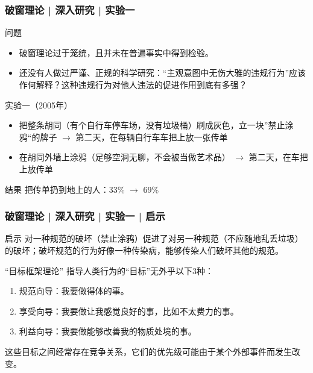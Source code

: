 \begin{frame}
  \frametitle{破窗理论 | 深入研究 | 实验一}
  \begin{block}{问题}
    \begin{itemize}
      \item 破窗理论过于笼统，且并未在普遍事实中得到检验。
      \item 还没有人做过严谨、正规的科学研究：“主观意图中无伤大雅的违规行为”应该作何解释？这种违规行为对他人违法的促进作用到底有多强？
    \end{itemize}
  \end{block}
  \pause
  \begin{block}{实验一（2005年）}
    \begin{itemize}
      \item 把整条胡同（有个自行车停车场，没有垃圾桶）刷成灰色，立一块”禁止涂鸦“的牌子 $\rightarrow$ 第二天，在每辆自行车车把上放一张传单
      \item 在胡同外墙上涂鸦（足够空洞无聊，不会被当做艺术品） $\rightarrow$ 第二天，在车把上放传单
    \end{itemize}
  \end{block}
  \pause
  \begin{block}{结果}
    把传单扔到地上的人：33\% $\rightarrow$ 69\%
  \end{block}
\end{frame}

\begin{frame}
  \frametitle{破窗理论 | 深入研究 | 实验一 | 启示}
  \begin{block}{启示}
对一种规范的破坏（禁止涂鸦）促进了对另一种规范（不应随地乱丢垃圾）的破坏；破坏规范的行为好像一种传染病，能够传染人们破坏其他的规范。
  \end{block}
  \pause
  \begin{block}{“目标框架理论”}
    指导人类行为的“目标”无外乎以下3种：
    \begin{enumerate}
      \item 规范向导：我要做得体的事。
      \item 享受向导：我要做让我感觉良好的事，比如不太费力的事。
      \item 利益向导：我要做能够改善我的物质处境的事。
    \end{enumerate}
    这些目标之间经常存在竞争关系，它们的优先级可能由于某个外部事件而发生改变。
  \end{block}
\end{frame}

